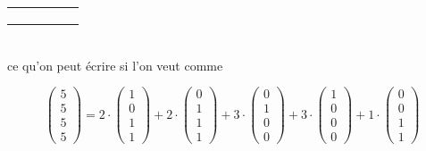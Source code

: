 \documentclass{article}
\begin{document}
\begin{tabular}{|c|c|c|c|c|}
  \hline
  \cellcolor{blue} & \cellcolor{blue} & \cellcolor{violet} & \cellcolor{violet} & \cellcolor{violet} \\
  \hline
  \cellcolor{red} & \cellcolor{red} & \cellcolor{red} & \cellcolor{green} & \cellcolor{green} \\
  \hline
  \cellcolor{blue} & \cellcolor{blue} & \cellcolor{yellow} & \cellcolor{green} & \cellcolor{green} \\
  \hline
  \cellcolor{blue} & \cellcolor{blue} & \cellcolor{yellow} & \cellcolor{green} & \cellcolor{green} \\
  \hline
\end{tabular} \\

ce qu'on peut écrire si l'on veut comme

\begin{equation}
	\left(\begin{array}{c}
	5 \\ 5 \\ 5 \\ 5
	\end{array}\right) = 
	2\cdot\left(\begin{array}{c}
	1 \\ 0 \\ 1 \\ 1
	\end{array}\right) +
	2\cdot\left(\begin{array}{c}
	0 \\ 1 \\ 1 \\ 1
	\end{array}\right) +
	3\cdot\left(\begin{array}{c}
	0 \\ 1 \\ 0 \\ 0
	\end{array}\right) +
	3\cdot\left(\begin{array}{c}
	1 \\ 0 \\ 0 \\ 0
	\end{array}\right) +
	1\cdot\left(\begin{array}{c}
	0 \\ 0 \\ 1 \\ 1
	\end{array}\right)
\end{equation}
\end{document}
